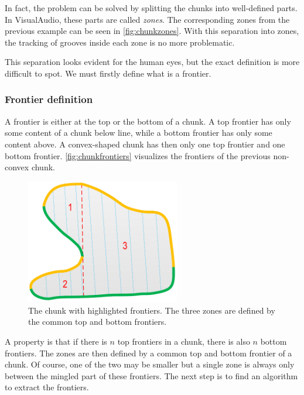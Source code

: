 In fact, the problem can be solved by splitting the chunks into well-defined parts. In VisualAudio, these parts are called \emph{zones}. The corresponding zones from the previous example can be seen in \autoref{fig:chunkzones}. With this separation into zones, the tracking of grooves inside each zone is no more problematic.

This separation looks evident for the human eyes, but the exact definition is more difficult to spot. We must firstly define what is a frontier.

\subsubsection{Frontier definition}

A frontier is either at the top or the bottom of a chunk. A top frontier has only some content of a chunk below line, while a bottom frontier has only some content above. A convex-shaped chunk has then only one top frontier and one bottom frontier. \autoref{fig:chunkfrontiers} visualizes the frontiers of the previous non-convex chunk.

\begin{figure}[!ht]
\centering
\includegraphics[width=0.6\textwidth]{images/chunk-frontiers}
\caption[The chunk with highlighted frontiers.]
{The chunk with highlighted frontiers. The three zones are defined by the common top and bottom frontiers.}
\label{fig:chunkfrontiers}
\end{figure}

A property is that if there is $n$ top frontiers in a chunk, there is also $n$ bottom frontiers. The zones are then defined by a common top and bottom frontier of a chunk. Of course, one of the two may be smaller but a single zone is always only between the mingled part of these frontiers. The next step is to find an algorithm to extract the frontiers.

